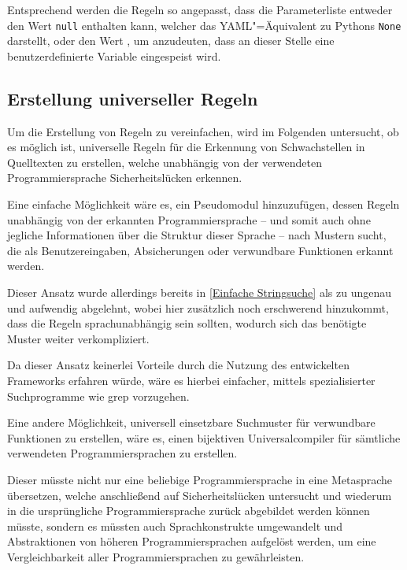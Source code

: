                 Entsprechend werden die Regeln so angepasst,
                dass die Parameterliste entweder den Wert
                \lstinline{null} enthalten kann,
                welcher das
                \gls{YAML}"=Äquivalent zu Pythons
                \lstinline{None} darstellt,
                oder
                den Wert
                ,
                um anzudeuten,
                dass an dieser Stelle eine benutzerdefinierte Variable eingespeist wird.

        \subsection{Erstellung universeller Regeln}
            Um die Erstellung von Regeln zu vereinfachen,
            wird im Folgenden untersucht,
            ob es möglich ist,
            universelle Regeln für die Erkennung von Schwachstellen in Quelltexten zu erstellen,
            welche unabhängig von der verwendeten Programmiersprache Sicherheitslücken erkennen.

            Eine einfache Möglichkeit wäre es,
            ein Pseudomodul hinzuzufügen,
            dessen Regeln unabhängig von der erkannten Programmiersprache
            -- und
            somit auch ohne jegliche Informationen über die Struktur dieser Sprache
            -- nach Mustern sucht,
            die als Benutzereingaben,
            Absicherungen oder
            verwundbare Funktionen erkannt werden.

            Dieser Ansatz wurde allerdings bereits in
            \vref{Einfache Stringsuche} als zu ungenau und
            aufwendig abgelehnt,
            wobei hier zusätzlich noch erschwerend hinzukommt,
            dass die Regeln sprachunabhängig sein sollten,
            wodurch sich das benötigte Muster weiter verkompliziert.

            Da dieser Ansatz keinerlei Vorteile durch die Nutzung des entwickelten Frameworks erfahren würde,
            wäre es hierbei einfacher,
            mittels spezialisierter Suchprogramme
            wie
            \gls{grep} vorzugehen.

            Eine andere Möglichkeit,
            universell einsetzbare Suchmuster für verwundbare Funktionen zu erstellen,
            wäre es,
            einen bijektiven Universalcompiler für sämtliche verwendeten Programmiersprachen zu erstellen.

            Dieser müsste nicht nur eine beliebige Programmiersprache in eine Metasprache übersetzen,
            welche anschließend auf Sicherheitslücken untersucht und
            wiederum in die ursprüngliche Programmiersprache zurück abgebildet werden können müsste,
            sondern es müssten auch Sprachkonstrukte umgewandelt und
            Abstraktionen von höheren Programmiersprachen aufgelöst werden,
            um eine Vergleichbarkeit aller Programmiersprachen zu gewährleisten.


